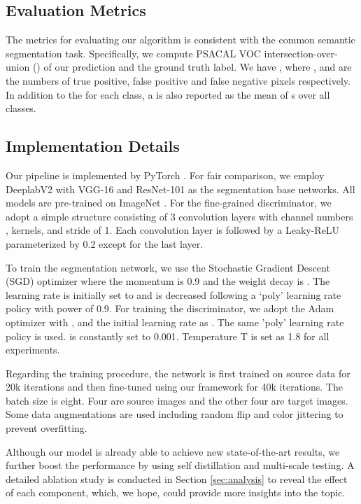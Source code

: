 \documentclass[runningheads]{llncs}
\begin{document}
\subsection{Evaluation Metrics}
The metrics for evaluating our algorithm is consistent with the common semantic segmentation task. Specifically, we compute PSACAL VOC intersection-over-union () \cite{pascal_voc} of our prediction and the ground truth label. We have , where ,  and  are the numbers of true positive, false positive and false negative pixels respectively. In addition to the  for each class, a  is also reported as the mean of s over all classes. 

\subsection{Implementation Details}
Our pipeline is implemented by PyTorch \cite{paszke2017pytorch}. For fair comparison, we employ DeeplabV2 \cite{deeplabv2} with VGG-16 \cite{vgg} and ResNet-101 \cite{resnet} as the segmentation base networks. All models are pre-trained on ImageNet \cite{imagenet_cvpr09}. For the fine-grained discriminator, we adopt a simple structure consisting of 3 convolution layers with channel numbers ,  kernels, and stride of 1. Each convolution layer is followed by a Leaky-ReLU \cite{leaky_relu} parameterized by 0.2 except for the last layer.

To train the segmentation network, we use the Stochastic Gradient
Descent (SGD) optimizer where the momentum is 0.9 and the weight decay is . The learning rate is initially set to  and is decreased following a `poly' learning rate policy with power of 0.9. For training the discriminator, we adopt the Adam optimizer with ,  and the initial learning rate as . The same 'poly' learning rate policy is used.  is constantly set to 0.001. Temperature T is set as 1.8 for all experiments.


Regarding the training procedure, the network is first trained on source data for 20k iterations and then fine-tuned using our framework for 40k iterations. The batch size is eight. Four are source images and the other four are target images. Some data augmentations are used including random flip and color jittering to prevent overfitting.

Although our model is already able to achieve new state-of-the-art results, we further boost the performance by using self distillation \cite{born_again, Label_Refinery, gift_knowledge_distillation} and multi-scale testing. A detailed ablation study is conducted in Section \ref{sec:analysis} to reveal the effect of each component, which, we hope, could provide more insights into the topic. 
\end{document}
